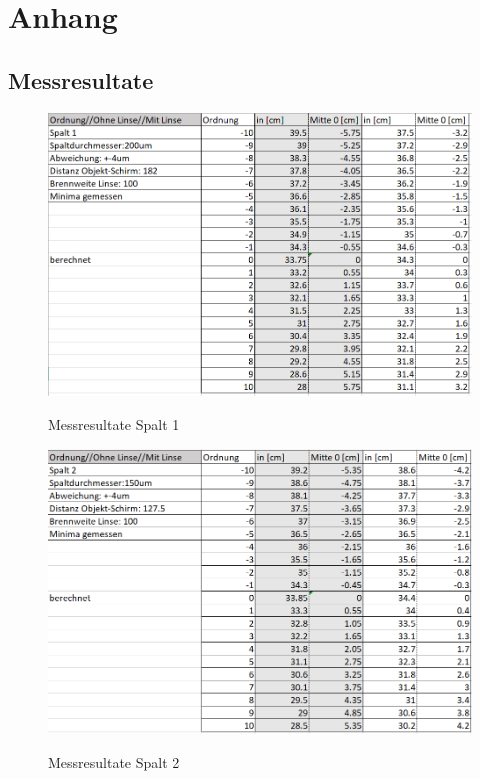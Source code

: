\chapter*{Anhang}
\thispagestyle{fancy} 
\section{Messresultate}
\label{sec:messresultate}
\begin{figure}[h]
\centering
\includegraphics[width=\textwidth]{Bilder/messung1.png} 
\label{fig:messresultate1}
\caption{Messresultate Spalt 1}
\end{figure}
\newpage

\begin{figure}[h]
\centering
\includegraphics[width=\textwidth]{Bilder/messung2.png} 
\label{fig:messresultate2}
\caption{Messresultate Spalt 2}
\end{figure}
\newpage

